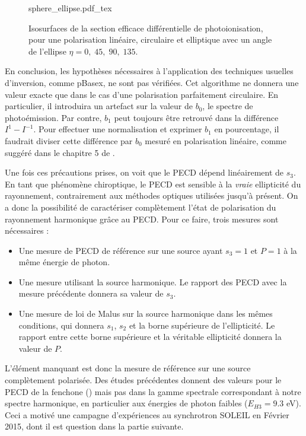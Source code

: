 \begin{figure}[!ht]
\centering
\def\svgwidth{1\columnwidth}
{sphere_ellipse.pdf_tex}
\caption{Isosurfaces de la section efficace différentielle de photoionisation, pour une polarisation linéaire, circulaire et elliptique avec un angle de l'ellipse $\eta=0,\;45,\;90,\;135$\degres.}
\label{fig:sphere_ell}
\end{figure}

En conclusion, les hypothèses nécessaires à l'application des techniques usuelles d'inversion, comme pBasex, ne sont pas vérifiées. Cet algorithme ne donnera une valeur exacte que dans le cas d'une polarisation parfaitement circulaire. En particulier, il introduira un artefact sur la valeur de $b_0$, le spectre de photoémission. Par contre, $b_1$ peut toujours être retrouvé dans la différence $I^1-I^{-1}$. Pour effectuer une normalisation et exprimer $b_1$ en pourcentage, il faudrait diviser cette différence par $b_0$ mesuré en polarisation linéaire, comme suggéré dans le chapitre 5 de .

Une fois ces précautions prises, on voit que le PECD dépend linéairement de $s_3$. En tant que phénomène chiroptique, le PECD est sensible à la \textit{vraie} ellipticité du rayonnement, contrairement aux méthodes optiques utilisées jusqu'à présent. On a donc la possibilité de caractériser complètement l'état de polarisation du rayonnement harmonique grâce au PECD. Pour ce faire, trois mesures sont nécessaires :
\begin{itemize}
\renewcommand{\labelitemi}{$\bullet$}
\setlength\itemsep{1em}
\item Une mesure de PECD de référence sur une source ayant $s_3 = 1$ et $P = 1$ à la même énergie de photon. 
\item Une mesure utilisant la source harmonique. Le rapport des PECD avec la mesure précédente donnera sa valeur de $s_3$.
\item Une mesure de loi de Malus sur la source harmonique dans les mêmes conditions, qui donnera $s_1$, $s_2$ et la borne supérieure de l'ellipticité. Le rapport entre cette borne supérieure et la véritable ellipticité donnera la valeur de $P$.
\end{itemize}
\vspace{12pt}
L'élément manquant est donc la mesure de référence sur une source complètement polarisée. Des études précédentes donnent des valeurs pour le PECD de la fenchone () mais pas dans la gamme spectrale correspondant à notre spectre harmonique, en particulier aux énergies de photon faibles ($E_{H3} = 9.3$ eV). Ceci a motivé une campagne d'expériences au synchrotron SOLEIL en Février 2015, dont il est question dans la partie suivante.

